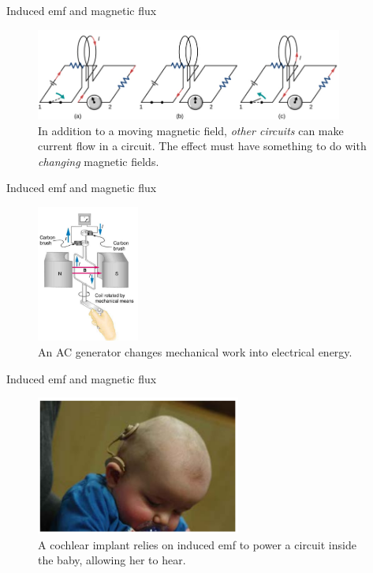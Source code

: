 \documentclass{beamer}
\begin{document}
\begin{frame}{Induced emf and magnetic flux}
\begin{figure}
\centering
\includegraphics[width=0.9\textwidth]{figures/farad2.png}
\caption{\label{fig:farad2} In addition to a moving magnetic field, \textit{other circuits} can make current flow in a circuit.  The effect must have something to do with \textit{changing} magnetic fields.}
\end{figure}
\end{frame}

\begin{frame}{Induced emf and magnetic flux}
\begin{figure}
\centering
\includegraphics[width=0.3\textwidth]{figures/motorz.png}
\caption{\label{fig:motorz} An AC generator changes mechanical work into electrical energy.}
\end{figure}
\end{frame}

\begin{frame}{Induced emf and magnetic flux}
\begin{figure}
\centering
\includegraphics[width=0.6\textwidth]{figures/baby.png}
\caption{\label{fig:baby} A cochlear implant relies on induced emf to power a circuit inside the baby, allowing her to hear.}
\end{figure}
\end{frame}
\end{document}
